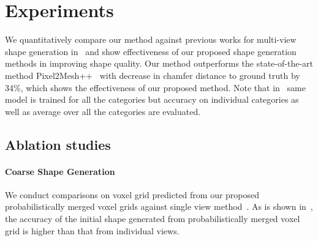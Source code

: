 \section*{Experiments}

We quantitatively compare our method against previous works for multi-view shape generation in~ and show effectiveness of our proposed shape generation methods in improving shape quality. Our method outperforms the state-of-the-art method  Pixel2Mesh++~\cite{wen2019pixel2mesh++} with
decrease in chamfer distance to ground truth by 34\%, which shows the effectiveness of our proposed method.
Note that in~ same model is trained for all the categories but accuracy on individual categories as well as average over all the categories are evaluated.



\subsection*{Ablation studies}

\vspace{-2mm}
\paragraph{Coarse Shape Generation}
We conduct comparisons on voxel grid predicted from our proposed probabilistically merged voxel grids against single view method~\cite{gkioxari2019meshrcnn}.
As is shown in~, the accuracy of the initial shape generated from probabilistically merged voxel grid is higher than that from individual views.


\vspace{-2mm}
